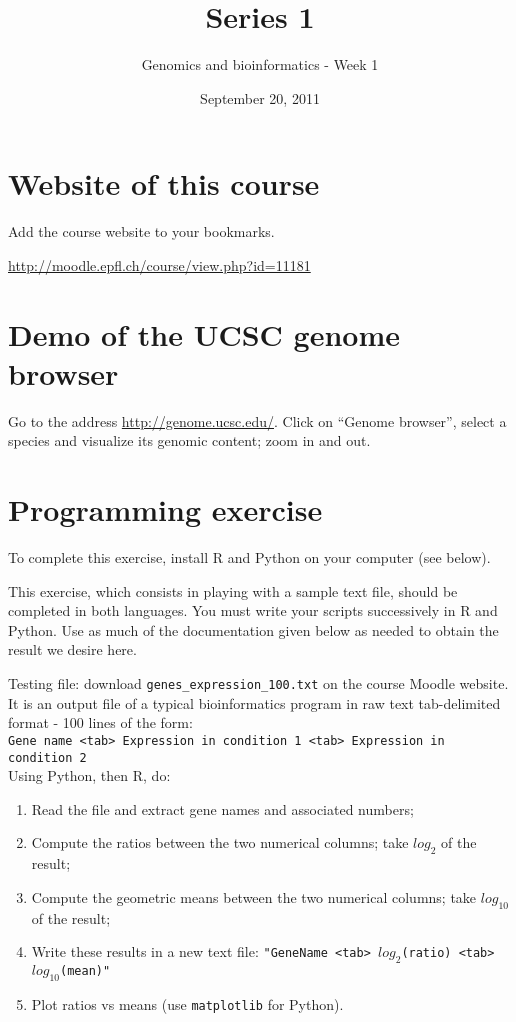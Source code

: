 \documentclass[a4paper,11pt]{article}
\title{Series 1}
\date{September 20, 2011}
\author{Genomics and bioinformatics - Week 1}
\begin{document}
\maketitle

\section{Website of this course}
Add the course website to your bookmarks.

\url{http://moodle.epfl.ch/course/view.php?id=11181}

\section{Demo of the UCSC genome browser}
Go to the address \url{http://genome.ucsc.edu/}. Click on ``Genome browser'', select a species
and visualize its genomic content; zoom in and out.

\section{Programming exercise}
To complete this exercise, install R and Python on your computer (see below).

This exercise, which consists in playing with a sample text file, should be completed in both languages. You must write your scripts successively in R and Python. Use as much of the documentation given below as needed to obtain the result we desire here.

Testing file: download \texttt{genes\_expression\_100.txt} on the course Moodle website. It is an output file of a typical bioinformatics program in raw text tab-delimited format - 100 lines of the form:\\

\texttt{Gene name <tab> Expression in condition 1 <tab> Expression in condition 2}\\

Using Python, then R, do:
\begin{enumerate}
\item Read the file and extract gene names and associated numbers;
\item Compute the ratios between the two numerical columns; take $log_{2}$ of the result;
\item Compute the geometric means between the two numerical columns; take $log_{10}$ of the result;
\item Write these results in a new text file: \texttt{"GeneName <tab> $log_2$(ratio) <tab> $log_{10}$(mean)"}
\item Plot ratios vs means (use  \texttt{matplotlib} for Python).
\end{enumerate}
\end{document}
